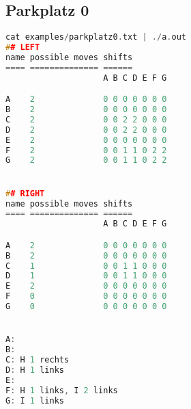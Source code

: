 \documentclass[a4paper,10pt,ngerman]{scrartcl}
\begin{document}
\subsection*{Parkplatz 0}
\begin{lstlisting}[language=C++]
cat examples/parkplatz0.txt | ./a.out
## LEFT
name possible moves shifts
==== ============== ======
                    A B C D E F G

A    2              0 0 0 0 0 0 0
B    2              0 0 0 0 0 0 0
C    2              0 0 2 2 0 0 0
D    2              0 0 2 2 0 0 0
E    2              0 0 0 0 0 0 0
F    2              0 0 1 1 0 2 2
G    2              0 0 1 1 0 2 2


## RIGHT
name possible moves shifts
==== ============== ======
                    A B C D E F G

A    2              0 0 0 0 0 0 0
B    2              0 0 0 0 0 0 0
C    1              0 0 1 1 0 0 0
D    1              0 0 1 1 0 0 0
E    2              0 0 0 0 0 0 0
F    0              0 0 0 0 0 0 0
G    0              0 0 0 0 0 0 0


A:
B:
C: H 1 rechts
D: H 1 links
E:
F: H 1 links, I 2 links
G: I 1 links
\end{lstlisting}
\end{document}
